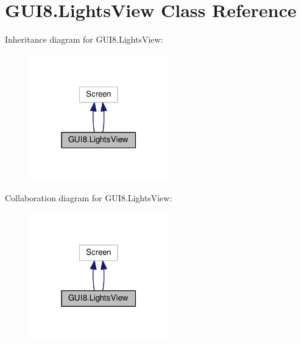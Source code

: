 \hypertarget{classGUI8_1_1LightsView}{}\section{G\+U\+I8.\+Lights\+View Class Reference}
\label{classGUI8_1_1LightsView}


Inheritance diagram for G\+U\+I8.\+Lights\+View\+:
\nopagebreak
\begin{figure}[H]
\begin{center}
\leavevmode
\includegraphics[width=171pt]{classGUI8_1_1LightsView__inherit__graph}
\end{center}
\end{figure}


Collaboration diagram for G\+U\+I8.\+Lights\+View\+:
\nopagebreak
\begin{figure}[H]
\begin{center}
\leavevmode
\includegraphics[width=171pt]{classGUI8_1_1LightsView__coll__graph}
\end{center}
\end{figure}
